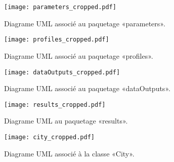 \documentclass[11pt,a4paper,openany]{article}
\begin{document}
\begin{figure}
    \centering
    \texttt{[image: parameters\_cropped.pdf]}
    \caption{Diagrame UML associé au paquetage «parameters».}
    \label{fig:parameters}
\end{figure}

\begin{figure}
    \centering
    \texttt{[image: profiles\_cropped.pdf]}
    \caption{Diagrame UML associé au paquetage «profiles».}
    \label{fig:profiles}
\end{figure}

\begin{figure}
    \centering
    \texttt{[image: dataOutputs\_cropped.pdf]}
    \caption{Diagrame UML associé au paquetage «dataOutputs».}
    \label{fig:dataOutputs}
\end{figure}

\begin{figure}
    \centering
    \texttt{[image: results\_cropped.pdf]}
    \caption{Diagrame UML au paquetage «results».}
    \label{fig:results}
\end{figure}

\begin{figure}
    \centering
    \texttt{[image: city\_cropped.pdf]}
    \caption{Diagrame UML associé à la classe «City».}
    \label{fig:city}
\end{figure}
\end{document}
